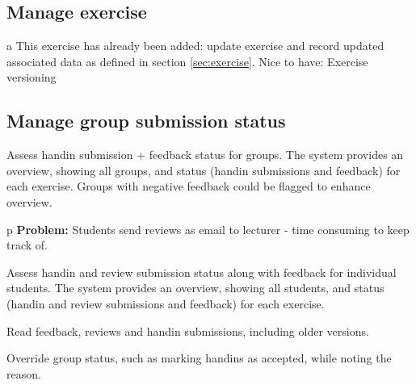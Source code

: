 \documentclass[Main]{subfiles}
\begin{document}
\subsection{Manage exercise} \label{sec:ManageExercise}

\begin{DataIntro}
 
\end{DataIntro}

\begin{TaskTable}
\RecordAddi
{a}
{This exercise has already been added: update exercise and record updated associated data as defined in section \ref{sec:exercise}. }{Nice to have: Exercise versioning}{}

\end{TaskTable}





\subsection{Manage group submission status}\label{sec:ManageGroupSubmissions}

\begin{DataIntro}
\end{DataIntro}
\begin{TaskTable}
\Record
{Assess handin submission + feedback status for groups.}
{The system provides an overview, showing all groups, and status (handin submissions and feedback) for each exercise. 
Groups with negative feedback could be flagged to enhance overview.}{}

\RecordAddi
{p}
{\textbf{Problem:} Students send reviews as email to lecturer - time consuming to keep track of.}{}

\Record
{Assess handin and review submission status along with feedback for individual students.}
{The system provides an overview, showing all students, and status (handin and review submissions and feedback) for each exercise.}
{}

\Record
{Read feedback, reviews and handin submissions, including older versions.}
{}
{}

\Record
{Override group status, such as marking handins as accepted, while noting the reason.}
{}
{}
\end{TaskTable}
\end{document}
